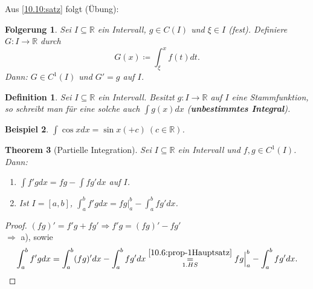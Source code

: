 \documentclass[14pt,titlepage,ngerman,a4paper,headsepline,DIV15,halfparskip*]{scrartcl}
\newcommand{\R}{\mathbb{R}}
\theoremstyle{named}
\newtheorem{namedtheorem}{Theorem} \counterwithin{namedtheorem}{section}
\theoremstyle{dotless}
\newtheorem{beispiel}[namedtheorem]{Beispiel}
\newtheorem{folg}[namedtheorem]{Folgerung}
\newtheorem*{definition}{Definition}
\begin{document}
Aus \ref{10.10:satz} folgt (Übung):

\begin{folg} \label{10.12:folg}
	Sei $I \subseteq \R$ ein Intervall, $g \in C(I)$ und $\xi \in I$ (fest). Definiere $G \colon I \rightarrow \R$ durch
	$$ G(x) \coloneqq \int_{\xi}^{x} f(t) dt. $$
	Dann: $G \in C^{1}(I)$ und $G' = g$ auf $I$.
\end{folg}

\begin{definition}
	Sei $I \subseteq \R$ ein Intervall. Besitzt $g \colon I \rightarrow \R$ auf $I$ eine Stammfunktion, so schreibt man für eine solche auch $\int g(x) dx$ (\textbf{unbestimmtes Integral}).
\end{definition}

\begin{beispiel} 
	$\int \cos x dx = \sin x ( + c) ~(c \in \R)$.
\end{beispiel}

\begin{namedtheorem}[Partielle Integration]
	Sei $I \subseteq \R$ ein Intervall und $f, g \in C^{1}(I)$. Dann:
	\begin{enumerate}
		\item $\int f' g dx = f g - \int f g' dx$ auf $I$.
		\item Ist $I = [a, b]$, $\int_{a}^{b} f' g dx = f g \Big|_{a}^{b} - \int_{a}^{b} f g' dx$.
	\end{enumerate}
\end{namedtheorem}

\begin{proof}
	$(f g)' = f' g + f g' \Rightarrow f' g = (fg)' - fg'$ \\
	$\Rightarrow$ a), sowie \\ 
	$$ \int_{a}^{b} f' g dx = \int_{a}^{b} (fg)' dx - \int_{a}^{b} fg' dx \overset{\ref{10.6:prop-1Hauptsatz}}{\underset{1. HS}{=}} fg \Big|_{a}^{b} - \int_{a}^{b} fg' dx. $$ 
\end{proof}
\end{document}
